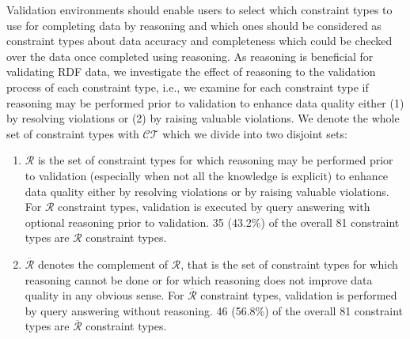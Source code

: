 \documentclass{acm_proc_article-sp}
\begin{document}


Validation environments should enable users to select which constraint types to use for completing data by reasoning 
and which ones should be considered as constraint types about data accuracy and completeness which could be checked over the data once completed using reasoning.
As reasoning is beneficial for validating RDF data,
we investigate the effect of reasoning to the validation process of each constraint type, i.e.,
we examine for each constraint type if reasoning may be performed prior to validation to enhance data quality
either (1) by resolving violations or (2) by raising valuable violations.
We denote the whole set of constraint types with $\mathcal{CT}$ which we divide into two disjoint sets: 
\begin{enumerate}
\item $\mathcal{R}$ is the set of constraint types for which reasoning may be performed prior to validation (especially when not all the knowledge is explicit) to enhance data quality
either by resolving violations or by raising valuable violations.
For $\mathcal{R}$ constraint types, validation is executed by query answering with optional reasoning prior to validation.
35 (43.2\%) of the overall 81 constraint types are $\mathcal{R}$ constraint types.
\item $\overline{\mathcal{R}}$  denotes the complement of $\mathcal{R}$, that is the set of constraint types 
for which reasoning cannot be done or for which reasoning does not improve data quality in any obvious sense.
For $\overline{\mathcal{R}}$ constraint types, validation is performed by query answering without reasoning.
46 (56.8\%) of the overall 81 constraint types are $\overline{\mathcal{R}}$ constraint types.
\end{enumerate}
\end{document}
